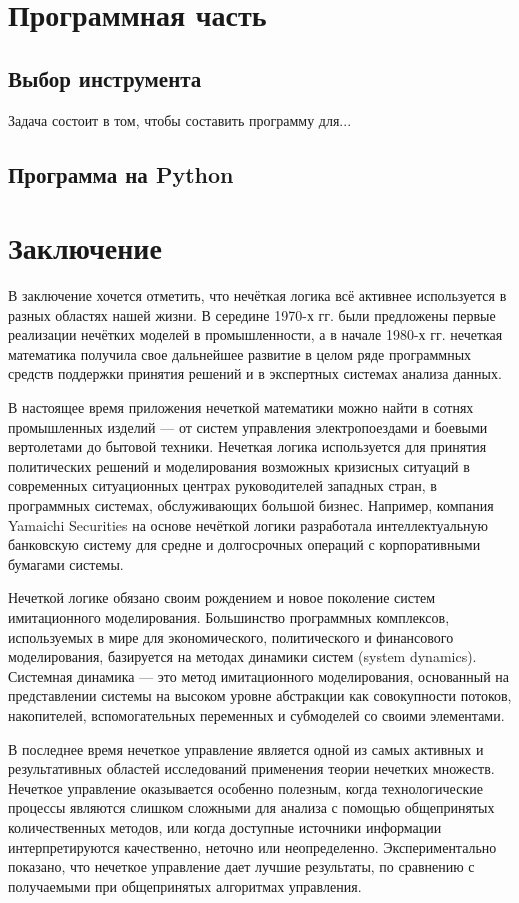 \documentclass[a4paper,12pt]{report}
\begin{document}
\chapter{Программная часть}
\section{Выбор инструмента}
Задача состоит в том, чтобы составить программу для...
\section{Программа на Python}


\chapter{Заключение}
В заключение хочется отметить, что нечёткая логика всё активнее используется в разных областях нашей жизни. В середине 1970-х гг. были предложены первые реализации нечётких моделей в промышленности, а в начале 1980-х гг. нечеткая математика получила свое дальнейшее развитие в целом ряде программных средств поддержки принятия решений и в экспертных системах анализа данных.

В настоящее время приложения нечеткой математики можно найти в сотнях промышленных изделий — от систем управления электропоездами и боевыми вертолетами до бытовой техники. Нечеткая логика используется для принятия политических решений и моделирования возможных кризисных ситуаций в современных ситуационных центрах руководителей западных стран, в программных системах, обслуживающих большой бизнес. Например, компания Yamaichi Securities на основе нечёткой логики разработала интеллектуальную банковскую систему для средне и долгосрочных операций с корпоративными бумагами системы.

Нечеткой логике обязано своим рождением и новое поколение систем имитационного моделирования. Большинство программных комплексов, используемых в мире для экономического, политического и финансового моделирования, базируется на методах динамики систем (system dynamics). Системная динамика — это метод имитационного моделирования, основанный на представлении системы на высоком уровне абстракции как совокупности потоков, накопителей, вспомогательных переменных и субмоделей со своими элементами.

В последнее время нечеткое управление является одной из самых активных и результативных областей исследований применения теории нечетких множеств. Нечеткое управление оказывается особенно полезным, когда технологические процессы являются слишком сложными для анализа с помощью общепринятых количественных методов, или когда доступные источники информации интерпретируются качественно, неточно или неопределенно. Экспериментально показано, что нечеткое управление дает лучшие результаты, по сравнению с получаемыми при общепринятых алгоритмах управления.
\end{document}
